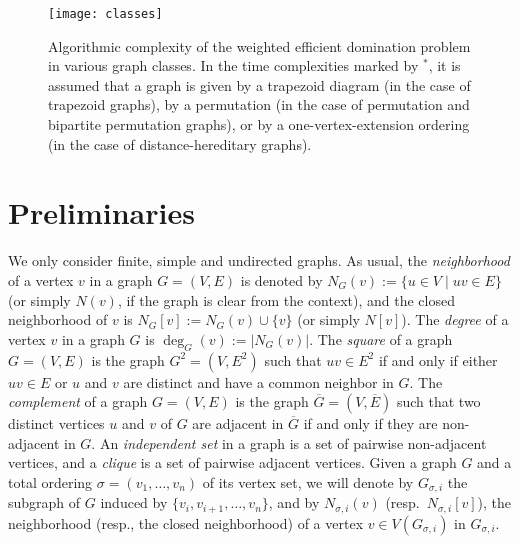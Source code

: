 \documentclass[]{elsarticle}
\begin{document}
\begin{figure}[ht]
\begin{center}
\texttt{[image: classes]}
\caption{
Algorithmic complexity of the weighted efficient domination problem in various graph classes.
In the time complexities marked by $^*$, it is assumed that a graph is given by a trapezoid diagram (in the case of trapezoid graphs), by a permutation (in the case of permutation and bipartite permutation graphs), or by a one-vertex-extension ordering (in the case of distance-hereditary graphs).
}\label{fig:classes}
\end{center}
\end{figure}

\section{Preliminaries}

We only consider finite, simple and undirected graphs.
As usual, the \emph{neighborhood} of a vertex $v$ in a graph $G = (V,E)$ is denoted by $N_G(v) := \{u\in V\mid uv\in E\}$ (or simply $N(v)$, if the graph is clear from the context), and the closed neighborhood of $v$ is $N_G[v]:= N_G(v)\cup \{v\}$ (or simply $N[v]$).
The \emph{degree} of a vertex $v$ in a graph $G$ is $\deg_G(v) := |N_G(v)|$.
The \emph{square} of a graph $G = (V,E)$ is the graph $G^2 = (V,E^2)$ such that $uv\in E^2$ if and only if either $uv\in E$ or $u$ and $v$ are distinct and have a common neighbor in $G$.
The \emph{complement} of a graph $G = (V,E)$ is the graph $\overline{G}= (V,\overline{E})$ such that two distinct vertices $u$ and $v$ of $G$ are adjacent in $\overline{G}$ if and only if they are non-adjacent in $G$.
An \emph{independent set} in a graph is a set of pairwise non-adjacent vertices, and a \emph{clique} is a set of pairwise adjacent vertices. 
Given a graph $G$ and a total ordering $\sigma=(v_1,\ldots, v_n)$ of its vertex set, we will denote by
$G_{\sigma,i}$ the subgraph of $G$ induced by $\{v_i,v_{i+1},\ldots, v_n\}$, and by $N_{\sigma,i}(v)$ (resp.~$N_{\sigma,i}[v]$), the neighborhood (resp., the closed neighborhood) of a vertex $v\in V(G_{\sigma,i})$ in $G_{\sigma,i}$.
\end{document}
